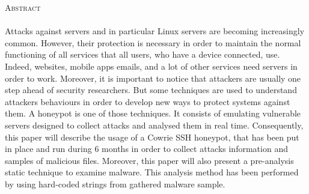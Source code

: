 \textsc{\LARGE Abstract}\\[0.5cm]

\paragraph{}

Attacks against servers and in particular Linux servers are becoming increasingly
common. However, their protection is necessary in order to maintain the normal functioning
of all services that all users, who have a device connected, use. Indeed, websites, mobile
apps emails, and a lot of other services need servers in order to work.
Moreover, it is important to notice that attackers  are usually one step ahead of security
researchers. But some techniques are used to understand attackers behaviours in order to 
develop new ways to protect systems against them. A honeypot is one of those techniques.
It consists of emulating vulnerable servers designed to collect attacks and analysed them
in real time.
Consequently, this paper will describe the usage of a Cowrie SSH honeypot,
that has been put in place and run during 6 months in order to collect attacks information
and samples of malicious files. Moreover, this paper will also present a pre-analysis
static technique to examine malware. This analysis method has been performed by using
hard-coded strings from gathered malware sample. 

\newpage